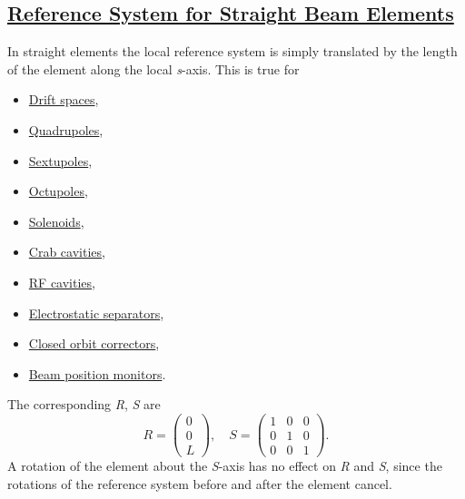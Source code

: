 \subsection{\href{straight}{Reference System for Straight Beam
    Elements}} 
\label{subsec:local_straight}
In straight elements the local reference system is simply translated by
the length of the element along the local \textit{s}-axis. 
This is true for  
\begin{itemize}
   \item \href{drift.html}{Drift spaces}, 
   \item \href{quadrupole.html}{Quadrupoles}, 
   \item \href{sextupole.html}{Sextupoles}, 
   \item \href{octupole.html}{Octupoles}, 
   \item \href{solenoid.html}{Solenoids}, 
   \item \href{crabcavity.html}{Crab cavities},
   \item \href{cavity.html}{RF cavities},
   \item \href{separator.html}{Electrostatic separators},
   \item \href{kickers.html}{Closed orbit correctors}, 
   \item \href{monitors.html}{Beam position monitors}. 
\end{itemize} 

The corresponding \textit{R}, \textit{S} are 
\[
R =
 \begin{pmatrix}
  0 \\
  0 \\
  L
 \end{pmatrix}
, \quad
S =
 \begin{pmatrix}
  1 & 0 &  0 \\
  0 & 1 &  0 \\
  0 & 0 &  1
 \end{pmatrix}
.
\]
A rotation of the element about the \textit{S}-axis has no effect on
\textit{R} and \textit{S}, since the rotations of the reference system
before and after the element cancel.  


